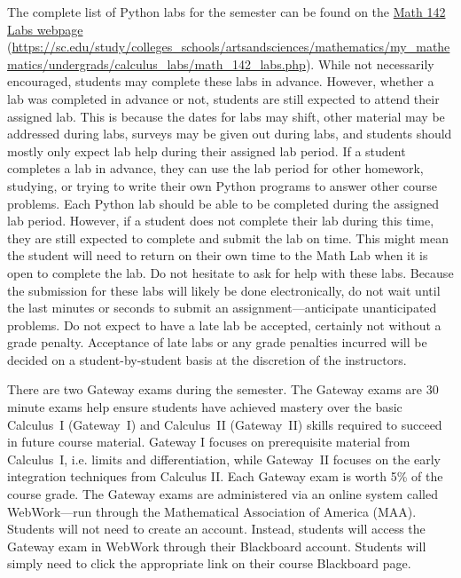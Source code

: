 \documentclass[11pt,letterpaper]{article}
\begin{document}
The complete list of Python labs for the semester can be found on the \href{https://sc.edu/study/colleges\_schools/artsandsciences/mathematics/my\_mathematics/undergrads/calculus\_labs/math\_142\_labs.php}{Math 142 Labs webpage} (\url{https://sc.edu/study/colleges\_schools/artsandsciences/mathematics/my\_mathematics/undergrads/calculus\_labs/math\_142\_labs.php}). While not necessarily encouraged, students may complete these labs in advance. However, whether a lab was completed in advance or not, students are still expected to attend their assigned lab. This is because the dates for labs may shift, other material may be addressed during labs, surveys may be given out during labs, and students should mostly only expect lab help during their assigned lab period. If a student completes a lab in advance, they can use the lab period for other homework, studying, or trying to write their own Python programs to answer other course problems. Each Python lab should be able to be completed during the assigned lab period. However, if a student does not complete their lab during this time, they are still expected to complete and submit the lab on time. This might mean the student will need to return on their own time to the Math Lab when it is open to complete the lab. Do not hesitate to ask for help with these labs. Because the submission for these labs will likely be done electronically, do not wait until the last minutes or seconds to submit an assignment---anticipate unanticipated problems. Do not expect to have a late lab be accepted, certainly not without a grade penalty. Acceptance of late labs or any grade penalties incurred will be decided on a student-by-student basis at the discretion of the instructors. 
\sectionbreak




There are two Gateway exams during the semester. The Gateway exams are 30 minute exams help ensure students have achieved mastery over the basic Calculus~I (Gateway~I) and Calculus~II (Gateway~II) skills required to succeed in future course material. Gateway I focuses on prerequisite material from Calculus~I, i.e. limits and differentiation, while Gateway~II focuses on the early integration techniques from Calculus II. Each Gateway exam is worth 5\% of the course grade. The Gateway exams are administered via an online system called WebWork---run through the Mathematical Association of America (MAA). Students will not need to create an account. Instead, students will access the Gateway exam in WebWork through their Blackboard account. Students will simply need to click the appropriate link on their course Blackboard page. \pspace
\end{document}
